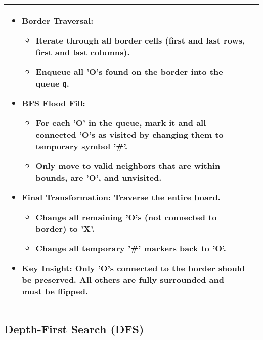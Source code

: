 \begin{summary}
\begin{center}
\begin{tabular}{ll}
{\begin{itemize}
                    \item \textbf{Border Traversal:}
                    \begin{itemize}
                        \item Iterate through all border cells (first and last rows, first and last columns).
                        \item Enqueue all 'O's found on the border into the queue \texttt{q}.
                    \end{itemize}
                
                    \item \textbf{BFS Flood Fill:}
                    \begin{itemize}
                        \item For each 'O' in the queue, mark it and all connected 'O's as visited by changing them to temporary symbol '\#'.
                        \item Only move to valid neighbors that are within bounds, are 'O', and unvisited.
                    \end{itemize}
                
                    \item \textbf{Final Transformation:} Traverse the entire board.
                    \begin{itemize}
                        \item Change all remaining 'O's (not connected to border) to 'X'.
                        \item Change all temporary '\#' markers back to 'O'.
                    \end{itemize}
                
                    \item \textbf{Key Insight:} Only 'O's connected to the border should be preserved. All others are fully surrounded and must be flipped.
                \end{itemize}                             
            } \\
            \bottomrule
        \end{tabular}
    \end{center}
\end{summary}
\newpage

\subsection{Depth-First Search (DFS)}


